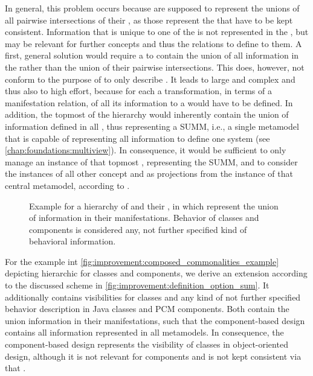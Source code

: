 In general, this problem occurs because \conceptmetamodels are supposed to represent the unions of all pairwise intersections of their \concretemetamodels, as those represent the \commonalities that have to be kept consistent.
Information that is unique to one of the \concretemetamodels is not represented in the \conceptmetamodel, but may be relevant for further concepts and thus the relations to define to them.
A first, general solution would require a \conceptmetamodel to contain the union of all information in the \concretemetamodels rather than the union of their pairwise intersections.
This does, however, not conform to the purpose of \conceptmetamodels to only describe \commonalities.
It leads to large and complex \conceptmetamodels and thus also to high effort, because for each \concretemetamodel a transformation, in terms of a manifestation relation, of all its information to a \conceptmetamodel would have to be defined.
In addition, the topmost \conceptmetamodel of the hierarchy would inherently contain the union of information defined in all \concretemetamodels, thus representing a \gls{SUMM}, i.e., a single metamodel that is capable of representing all information to define one system (see \autoref{chap:foundations:multiview}). %
In consequence, it would be sufficient to only manage an instance of that topmost \conceptmetamodel, representing the \gls{SUMM}, and to consider the instances of all other concept and \concretemetamodels as projections from the instance of that central metamodel, according to \textcite{atkinson2010a}.

\begin{figure}
    \centering
    
    \caption[\Commonalities with union of all information]{Example for a hierarchy of \conceptmetamodels and their \commonalities, in which \conceptmetamodels represent the union of information in their manifestations. Behavior of classes and components is considered any, not further specified kind of behavioral information.}
    \label{fig:improvement:definition_option_sum}
\end{figure}

For the example int \autoref{fig:improvement:composed_commonalities_example} depicting hierarchic \conceptmetamodels for classes and components, we derive an extension according to the discussed scheme in \autoref{fig:improvement:definition_option_sum}.
It additionally contains visibilities for classes and any kind of not further specified behavior description in Java classes and \gls{PCM} components.
Both \conceptmetamodels contain the union information in their manifestations, such that the component-based design \conceptmetamodel contains all information represented in all metamodels.
In consequence, the component-based design \conceptmetamodel represents the visibility of classes in object-oriented design, although it is not relevant for components and is not kept consistent via that \conceptmetamodel.

